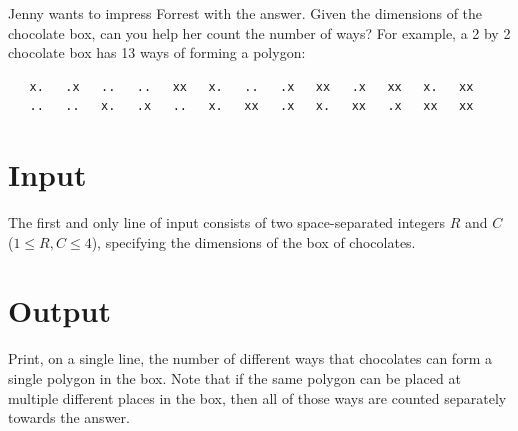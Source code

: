 Jenny wants to impress Forrest with the answer. Given the dimensions of the chocolate box, can you help her count the number of ways? For example, a 2 by 2 chocolate box has 13 ways of forming a polygon:
\begin{verbatim}
   x.   .x   ..   ..   xx   x.   ..   .x   xx   .x   xx   x.   xx
   ..   ..   x.   .x   ..   x.   xx   .x   x.   xx   .x   xx   xx
\end{verbatim}

\section*{Input}
The first and only line of input consists of two space-separated integers $R$ and $C$ ($1 \leq R, C \leq 4$), specifying the dimensions of the box of chocolates.

\section*{Output}
Print, on a single line, the number of different ways that chocolates can form a single polygon in the box. Note that if the same polygon can be placed at multiple different places in the box, then all of those ways are counted separately towards the answer.\\
